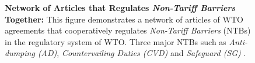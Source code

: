 \begin{figure}[h]
    \centering{
        
    }
    \caption{{\bf Network of Articles that Regulates \textit{Non-Tariff Barriers} Together:}
        This figure demonstrates a network of articles of WTO agreements
        that cooperatively regulates \textit{Non-Tariff Barriers} (NTBs) in the regulatory system of WTO.
        Three major NTBs such as \textit{Anti-dumping (AD)}, \textit{Countervailing Duties (CVD)}
        and \textit{Safeguard (SG)} .
    }
    \label{fig:ntb-explained}
\end{figure}